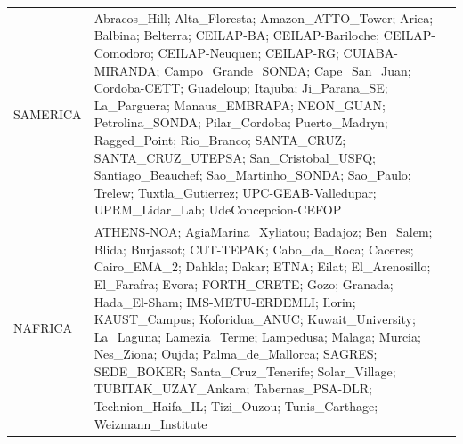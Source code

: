 \documentclass[journal abbreviation, manuscript]{copernicus}
\begin{document}
\begin{table}
\begin{tabularx}{\textwidth}{lX}
  SAMERICA  & Abracos\_Hill; Alta\_Floresta; Amazon\_ATTO\_Tower; Arica; Balbina; Belterra; CEILAP-BA; CEILAP-Bariloche; CEILAP-Comodoro; CEILAP-Neuquen; CEILAP-RG; CUIABA-MIRANDA; Campo\_Grande\_SONDA; Cape\_San\_Juan; Cordoba-CETT; Guadeloup; Itajuba; Ji\_Parana\_SE; La\_Parguera; Manaus\_EMBRAPA; NEON\_GUAN; Petrolina\_SONDA; Pilar\_Cordoba; Puerto\_Madryn; Ragged\_Point; Rio\_Branco; SANTA\_CRUZ; SANTA\_CRUZ\_UTEPSA; San\_Cristobal\_USFQ; Santiago\_Beauchef; Sao\_Martinho\_SONDA; Sao\_Paulo; Trelew; Tuxtla\_Gutierrez; UPC-GEAB-Valledupar; UPRM\_Lidar\_Lab; UdeConcepcion-CEFOP                                                                                                                                                                                                                                                                                                                                                                                                                                                                                                                                                                                                                                                                                                                                                                                                                                                                                                                                                            \\
  NAFRICA   & ATHENS-NOA; AgiaMarina\_Xyliatou; Badajoz; Ben\_Salem; Blida; Burjassot; CUT-TEPAK; Cabo\_da\_Roca; Caceres; Cairo\_EMA\_2; Dahkla; Dakar; ETNA; Eilat; El\_Arenosillo; El\_Farafra; Evora; FORTH\_CRETE; Gozo; Granada; Hada\_El-Sham; IMS-METU-ERDEMLI; Ilorin; KAUST\_Campus; Koforidua\_ANUC; Kuwait\_University; La\_Laguna; Lamezia\_Terme; Lampedusa; Malaga; Murcia; Nes\_Ziona; Oujda; Palma\_de\_Mallorca; SAGRES; SEDE\_BOKER; Santa\_Cruz\_Tenerife; Solar\_Village; TUBITAK\_UZAY\_Ankara; Tabernas\_PSA-DLR; Technion\_Haifa\_IL; Tizi\_Ouzou; Tunis\_Carthage; Weizmann\_Institute                                                                                                                                                                                                                                                                                                                                                                                                                                                                                                                                                                                                                                                                                                                                                                                                                                                                                                                                                       \\

\end{tabularx}
\end{table}
\end{document}
